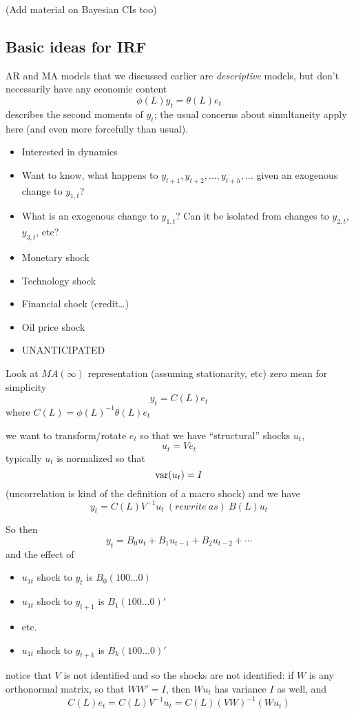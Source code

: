 (Add material on Bayesian CIs too)

\subsection{Basic ideas for IRF}

AR and MA models that we discussed earlier are \emph{descriptive}
models, but don't necessarily have any economic content
\[\phi(L) y_t = \theta(L) e_t\]
describes the second moments of $y_t$; the usual concerns about
simultaneity apply here (and even more forcefully than usual).

\begin{itemize}
\item Interested in dynamics
\item Want to know, what happens to $y_{t+1}, y_{t+2},\dots, y_{t+h},\dots$
  given an exogenous change to $y_{1,t}$?
\item What is an exogenous change to $y_{1,t}$? Can it be isolated
  from changes to $y_{2,t}$, $y_{3,t}$, etc?
\item Monetary shock
\item Technology shock
\item Financial shock (credit\dots)
\item Oil price shock
\item UNANTICIPATED
\end{itemize}

Look at $MA(\infty)$ representation (assuming stationarity, etc) zero mean
for simplicity \[y_t = C(L) e_t\] where $C(L) = \phi(L)^{-1} \theta(L) e_t$

we want to transform/rotate $e_t$ so that we have ``structural''
shocks $u_t$,
\[u_t = V e_t\] typically $u_t$ is normalized so that
\[\operatorname{var}( u_t ) = I\] (uncorrelation is kind of the definition of a macro
shock) and we have
\[y_t = C(L) V^{-1} u_t\ (rewrite\ as)\ B(L) u_t\]

So then
\[y_t = B_0 u_t + B_1 u_{t-1} + B_2 u_{t-2} + \cdots\]
and the effect of
\begin{itemize}
\item $u_{1t}$ shock to $y_t$ is $B_0 (1 0 0 \dots 0)$
\item $u_{1t}$ shock to $y_{t+1}$ is $B_1 (1 0 0 \dots 0)'$
\item etc.
\item $u_{1t}$ shock to $y_{t+k}$ is $B_k (1 0 0 \dots 0)'$
\end{itemize}
notice that $V$ is not identified and so the shocks are not identified:
if $W$ is any orthonormal matrix, so that $W W' = I$, then $W u_t$ has
variance $I$ as well, and
\[C(L) e_t = C(L) V^{-1} u_t = C(L) (VW)^{-1} ( W u_t )\]

